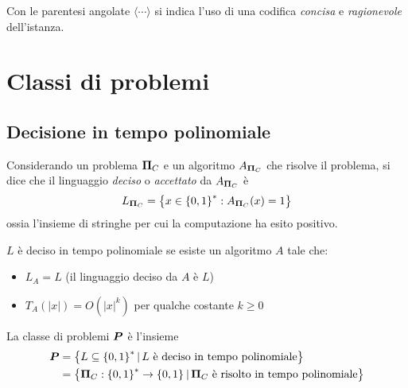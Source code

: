 \begin{definition}
    \label{def:encodingconciso}
    Con le parentesi angolate $\langle \cdots \rangle$ si indica l'uso di una codifica \emph{concisa} e \emph{ragionevole} dell'istanza.
\end{definition}


\section{Classi di problemi}
\label{sse:classidiprob}

\subsection{Decisione in tempo polinomiale}

Considerando un problema $\bm{\Pi}{}_{C}$ e un algoritmo $A_{\bm{\Pi}{}_{C}}$ che risolve il problema, si dice che il linguaggio \emph{deciso} o \emph{accettato} da $A_{\bm{\Pi}{}_{C}}$ è
\begin{equation*}
    L_{\bm{\Pi}{}_{C}} = \left\{ x \in \left\{0,1\right\}^{*} : A_{\bm{\Pi}{}_{C}}(x) = 1 \right\}
\end{equation*}
ossia l'insieme di stringhe per cui la computazione ha esito positivo.

\begin{definition}
    \label{def:tempopoli}
    $L$ è deciso in tempo polinomiale se esiste un algoritmo $A$ tale che:
    \begin{itemize}[itemsep=0pt]
        \item $L_A = L$ (il linguaggio deciso da $A$ è $L$)
        \item $T_A(|x|) = O(|x|^k)$ per qualche costante $k \geq 0$
    \end{itemize}
\end{definition}

\begin{definition}[Classe $\bp$]
    \label{def:classep}
    La classe di problemi $\bm{P}{}$ è l'insieme
    \begin{align*}
        \bm{P}{} &= \left\{ L \subseteq \left\{0,1\right\}^{*} |\, L \text{ è deciso in tempo polinomiale}\right\} \\
        &= \left\{ \bm{\Pi}{}_{C} : \left\{0,1\right\}^{*} \to \left\{0,1\right\}^{} |\, \bm{\Pi}{}_C \text{ è risolto in tempo polinomiale} \right\}
    \end{align*}
\end{definition}


